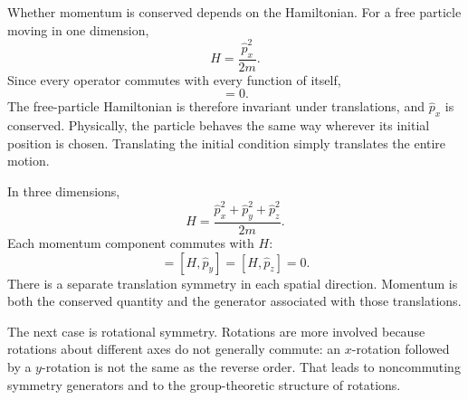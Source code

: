 Whether momentum is conserved depends on the Hamiltonian. For a free particle moving in one dimension,
\begin{equation}
H=\frac{\hat p_x^2}{2m}.
\end{equation}
Since every operator commutes with every function of itself,
\begin{equation}
[H,\hat p_x]=0.
\end{equation}
The free-particle Hamiltonian is therefore invariant under translations, and \(\hat p_x\) is conserved. Physically, the particle behaves the same way wherever its initial position is chosen. Translating the initial condition simply translates the entire motion.

In three dimensions,
\begin{equation}
H
=
\frac{\hat p_x^2+\hat p_y^2+\hat p_z^2}{2m}.
\end{equation}
Each momentum component commutes with \(H\):
\begin{equation}
[H,\hat p_x]=[H,\hat p_y]=[H,\hat p_z]=0.
\end{equation}
There is a separate translation symmetry in each spatial direction. Momentum is both the conserved quantity and the generator associated with those translations.

The next case is rotational symmetry. Rotations are more involved because rotations about different axes do not generally commute: an \(x\)-rotation followed by a \(y\)-rotation is not the same as the reverse order. That leads to noncommuting symmetry generators and to the group-theoretic structure of rotations.
